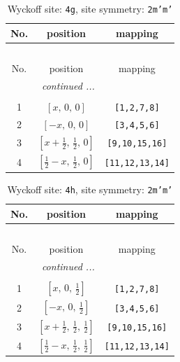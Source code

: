 \documentclass[fleqn,8pt]{jsarticle}
\begin{document}
\renewcommand{\arraystretch}{1.2}
\begin{longtable}{ccc}
\caption{Wyckoff site: {\tt 4g}, site symmetry: {\tt 2m'm'}}
 \\
 \hline \hline
No. & position & mapping \\ \hline \endfirsthead

\multicolumn{2}{l}{\tablename\ \thetable{}} \\
 \hline \hline
No. & position & mapping \\ \hline \endhead

 \hline \hline
\multicolumn{2}{r}{\footnotesize\it continued ...} \\ \endfoot

 \hline \hline
\multicolumn{2}{r}{} \\ \endlastfoot

1 & $\left[ x,\, 0,\, 0 \right]$ & {\tt [1,2,7,8]} \\ \hline
2 & $\left[ - x,\, 0,\, 0 \right]$ & {\tt [3,4,5,6]} \\ \hline
3 & $\left[ x + \frac{1}{2},\, \frac{1}{2},\, 0 \right]$ & {\tt [9,10,15,16]} \\ \hline
4 & $\left[ \frac{1}{2} - x,\, \frac{1}{2},\, 0 \right]$ & {\tt [11,12,13,14]} \\
\end{longtable}
\renewcommand{\arraystretch}{1.2}
\begin{longtable}{ccc}
\caption{Wyckoff site: {\tt 4h}, site symmetry: {\tt 2m'm'}}
 \\
 \hline \hline
No. & position & mapping \\ \hline \endfirsthead

\multicolumn{2}{l}{\tablename\ \thetable{}} \\
 \hline \hline
No. & position & mapping \\ \hline \endhead

 \hline \hline
\multicolumn{2}{r}{\footnotesize\it continued ...} \\ \endfoot

 \hline \hline
\multicolumn{2}{r}{} \\ \endlastfoot

1 & $\left[ x,\, 0,\, \frac{1}{2} \right]$ & {\tt [1,2,7,8]} \\ \hline
2 & $\left[ - x,\, 0,\, \frac{1}{2} \right]$ & {\tt [3,4,5,6]} \\ \hline
3 & $\left[ x + \frac{1}{2},\, \frac{1}{2},\, \frac{1}{2} \right]$ & {\tt [9,10,15,16]} \\ \hline
4 & $\left[ \frac{1}{2} - x,\, \frac{1}{2},\, \frac{1}{2} \right]$ & {\tt [11,12,13,14]} \\
\end{longtable}
\end{document}
